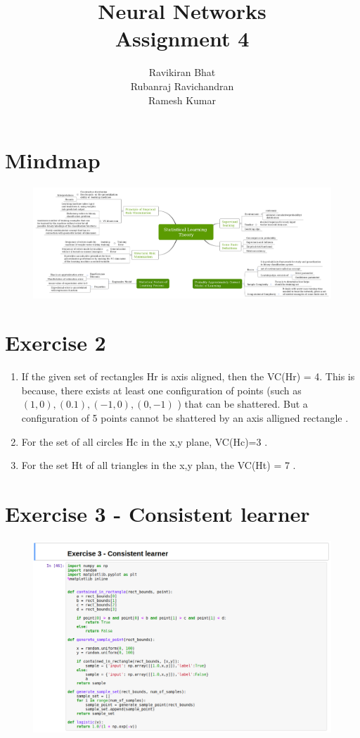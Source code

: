 \documentclass[12pt]{article}
\title{\Huge Neural Networks \\
[6mm]
Assignment 4\\}
\author{Ravikiran Bhat\\
Rubanraj Ravichandran\\
Ramesh Kumar}
\begin{document}
\maketitle
\newpage
\newpage
\section{Mindmap}
 \begin{figure}[H]
    \centering
    \includegraphics[scale=0.32,angle=90]{map.png}
  \end{figure}
\newpage 
\section{Exercise 2}
\begin{enumerate}
\item If the given set of rectangles Hr is axis aligned, then the VC(Hr) = 4. This is because, there exists at least one configuration of points (such as ${(1, 0),(0.1),(−1, 0),(0, −1)}$ ) that can be shattered. But a configuration of 5 points cannot be shattered by an axis alligned rectangle \cite{vcDimension}.
\item For the set of all circles Hc in the x,y plane, VC(Hc)=3 \cite{vcDimension}.
\item For the set Ht of all triangles in the x,y plan, the VC(Ht) = 7 \cite{vcDimension}.
\end{enumerate}

\section{Exercise 3 - Consistent learner}
 \begin{figure}[H]
	\centering
	\includegraphics[scale=0.40]{ex3_1.png}
\end{figure}
\end{document}
